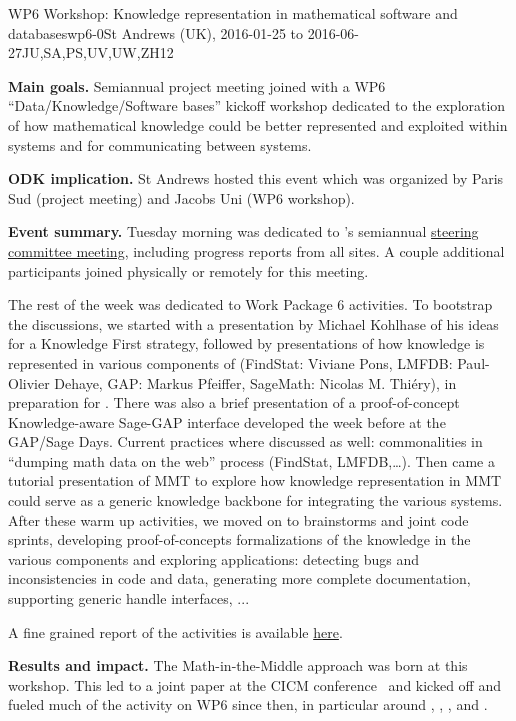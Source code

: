 \begin{event}{WP6 Workshop: Knowledge representation in mathematical software and databases}{wp6-0}{St Andrews (UK), 2016-01-25 to 2016-06-27}{JU,SA,PS,UV,UW,ZH}{12}{}

  \textbf{Main goals.} Semiannual \ODK project meeting joined with a
  WP6 ``Data/Knowledge/Software bases'' kickoff workshop dedicated to
  the exploration of how mathematical knowledge could be better
  represented and exploited within systems and for communicating
  between systems.


\textbf{ODK implication.} St Andrews hosted this event which was
organized by Paris Sud (project meeting) and Jacobs Uni (WP6 workshop).

\textbf{Event summary.} Tuesday morning was dedicated to \ODK's
semiannual
\href{http://opendreamkit.org/meetings/2016-01-25-DKS/SteeringCommittee/minutes/}
{steering committee meeting}, including progress reports from all
sites. A couple additional \ODK participants joined physically or
remotely for this meeting.

The rest of the week was dedicated to Work Package 6 activities. To
bootstrap the discussions, we started with a presentation by Michael
Kohlhase of his ideas for a Knowledge First strategy, followed by
presentations of how knowledge is represented in various components of
\ODK (FindStat: Viviane Pons, LMFDB: Paul-Olivier Dehaye, GAP: Markus
Pfeiffer, SageMath: Nicolas M. Thiéry), in preparation for
. There was also a brief presentation
of a proof-of-concept Knowledge-aware Sage-GAP interface developed the
week before at the GAP/Sage Days. Current practices where discussed as
well: commonalities in ``dumping math data on the web'' process
(FindStat, LMFDB,…). Then came a tutorial presentation of MMT to
explore how knowledge representation in MMT could serve as a generic
knowledge backbone for integrating the various systems.  After these
warm up activities, we moved on to brainstorms and joint code sprints,
developing proof-of-concepts formalizations of the knowledge in the
various components and exploring applications: detecting bugs and
inconsistencies in code and data, generating more complete
documentation, supporting generic handle interfaces, ...

A fine grained report of the activities is available
\href{http://opendreamkit.org/meetings/2016-01-25-DKS/report/}{here}.

\textbf{Results and impact.} The Math-in-the-Middle approach was born
at this workshop. This led to a joint paper at the CICM
conference~\cite{DehKohKon:iop16} and kicked off and fueled much of
the activity on WP6 since then, in particular around
, ,
, and
.


\end{event}
